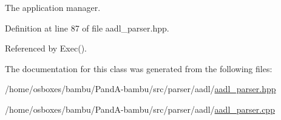 The application manager. 



Definition at line 87 of file aadl\+\_\+parser.\+hpp.



Referenced by Exec().



The documentation for this class was generated from the following files\+:\begin{DoxyCompactItemize}
\item 
/home/osboxes/bambu/\+Pand\+A-\/bambu/src/parser/aadl/\hyperlink{aadl__parser_8hpp}{aadl\+\_\+parser.\+hpp}\item 
/home/osboxes/bambu/\+Pand\+A-\/bambu/src/parser/aadl/\hyperlink{aadl__parser_8cpp}{aadl\+\_\+parser.\+cpp}\end{DoxyCompactItemize}
